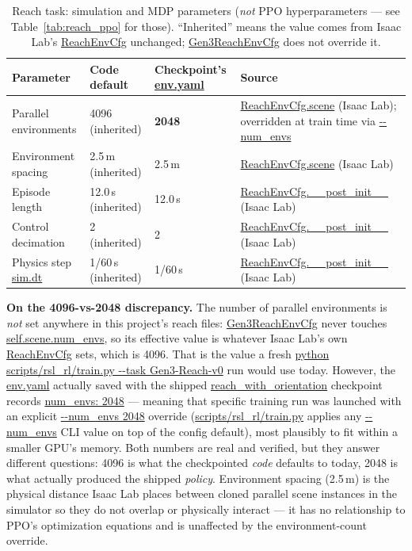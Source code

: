 \documentclass[11pt]{article}
\begin{document}
\begin{table}[h]
\centering
\caption{Reach task: simulation and MDP parameters (\emph{not} PPO hyperparameters --- see
Table~\ref{tab:reach_ppo} for those). ``Inherited'' means the value comes from Isaac
Lab's \url{ReachEnvCfg} unchanged; \url{Gen3ReachEnvCfg} does not override it.}
\label{tab:reach_mdp}
\begin{tabular}{P{3.1cm}P{2.1cm}P{2.5cm}P{5.6cm}}
\toprule
Parameter & Code default & Checkpoint's \url{env.yaml} & Source \\
\midrule
Parallel environments & 4096 (inherited) & \textbf{2048} & \url{ReachEnvCfg.scene} (Isaac Lab); overridden at train time via \url{--num_envs} \\
Environment spacing & 2.5\,m (inherited) & 2.5\,m & \url{ReachEnvCfg.scene} (Isaac Lab) \\
Episode length & 12.0\,s (inherited) & 12.0\,s & \url{ReachEnvCfg.__post_init__} (Isaac Lab) \\
Control decimation & 2 (inherited) & 2 & \url{ReachEnvCfg.__post_init__} (Isaac Lab) \\
Physics step \url{sim.dt} & 1/60\,s (inherited) & 1/60\,s & \url{ReachEnvCfg.__post_init__} (Isaac Lab) \\
\bottomrule
\end{tabular}
\end{table}

\textbf{On the 4096-vs-2048 discrepancy.} The number of parallel environments is
\emph{not} set anywhere in this project's reach files: \url{Gen3ReachEnvCfg} never
touches \url{self.scene.num_envs}, so its effective value is whatever Isaac
Lab's own \url{ReachEnvCfg} sets, which is 4096. That is the value a fresh
\url{python scripts/rsl_rl/train.py --task Gen3-Reach-v0} run would use today.
However, the \url{env.yaml} actually saved with the shipped
\url{reach_with_orientation} checkpoint records \url{num_envs: 2048} ---
meaning that specific training run was launched with an explicit
\url{--num_envs 2048} override (\url{scripts/rsl_rl/train.py} applies any
\url{--num_envs} CLI value on top of the config default), most plausibly to fit
within a smaller GPU's memory. Both numbers are real and verified, but they answer
different questions: 4096 is what the checkpointed \emph{code} defaults to today,
2048 is what actually produced the shipped \emph{policy}. Environment spacing
(2.5\,m) is the physical distance Isaac Lab places between cloned parallel scene
instances in the simulator so they do not overlap or physically interact --- it has
no relationship to PPO's optimization equations and is unaffected by the
environment-count override.
\end{document}
